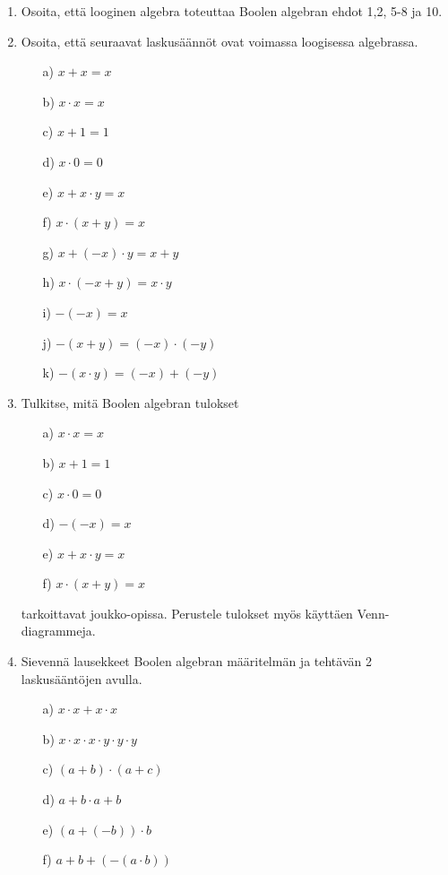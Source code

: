 \begin{enumerate}

\item Osoita, että looginen algebra toteuttaa Boolen algebran ehdot 1,2, 5-8 ja 10.

\item Osoita, että seuraavat laskusäännöt ovat voimassa loogisessa algebrassa.
\begin{itemize}
\item[a)] $x + x = x$
\item[b)] $x \cdot x = x$
\item[c)] $x + 1 = 1$
\item[d)] $x \cdot 0 = 0$
\item[e)] $x + x \cdot y = x$
\item[f)] $x \cdot (x + y) = x$
\item[g)] $x + (-x) \cdot y = x + y$
\item[h)] $x \cdot (-x + y) = x \cdot y$
\item[i)] $-(-x) = x$
\item[j)] $-(x + y) = (-x) \cdot (-y)$
\item[k)] $-(x \cdot y) = (-x) + (-y)$
\end{itemize}

\item
Tulkitse, mitä Boolen algebran tulokset
\begin{itemize}
\item[a)] $x \cdot x = x$
\item[b)] $x + 1 = 1$
\item[c)] $x \cdot 0 = 0$
\item[d)] $-(-x) = x$
\item[e)] $x + x \cdot y = x$
\item[f)] $x \cdot (x + y) = x$
\end{itemize}
tarkoittavat joukko-opissa. Perustele tulokset myös käyttäen Venn-diagrammeja.

\item
Sievennä lausekkeet Boolen algebran määritelmän ja tehtävän 2 laskusääntöjen avulla.
\begin{itemize}
\item[a)] $x \cdot x + x \cdot x$
\item[b)] $x \cdot x \cdot x \cdot y \cdot y \cdot y$
\item[c)] $(a + b) \cdot (a + c)$
\item[d)] $a + b \cdot a + b$
\item[e)] $(a + (-b)) \cdot b$
\item[f)] $a + b + (-(a \cdot b))$
\end{itemize}


\end{enumerate}

